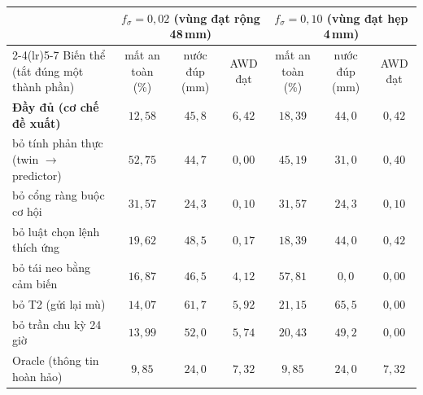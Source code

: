 
\begin{tabular}{@{}lcccccc@{}}
\toprule
 & \multicolumn{3}{c}{$f_\sigma=0{,}02$ (vùng đạt rộng 48\,mm)} & \multicolumn{3}{c}{$f_\sigma=0{,}10$ (vùng đạt hẹp 4\,mm)} \\
\cmidrule(lr){2-4}\cmidrule(lr){5-7}
Biến thể (tắt đúng một thành phần) & mất an toàn (\%) & nước đúp (mm) & AWD đạt & mất an toàn (\%) & nước đúp (mm) & AWD đạt \\
\midrule
\textbf{Đầy đủ (cơ chế đề xuất)} & $12{,}58$ & $45{,}8$ & $6{,}42$ & $18{,}39$ & $44{,}0$ & $0{,}42$ \\
bỏ tính phản thực (twin $\to$ predictor) & $52{,}75$ & $44{,}7$ & $0{,}00$ & $45{,}19$ & $31{,}0$ & $0{,}40$ \\
bỏ cổng ràng buộc cơ hội & $31{,}57$ & $24{,}3$ & $0{,}10$ & $31{,}57$ & $24{,}3$ & $0{,}10$ \\
bỏ luật chọn lệnh thích ứng & $19{,}62$ & $48{,}5$ & $0{,}17$ & $18{,}39$ & $44{,}0$ & $0{,}42$ \\
bỏ tái neo bằng cảm biến & $16{,}87$ & $46{,}5$ & $4{,}12$ & $57{,}81$ & $0{,}0$ & $0{,}00$ \\
bỏ T2 (gửi lại mù) & $14{,}07$ & $61{,}7$ & $5{,}92$ & $21{,}15$ & $65{,}5$ & $0{,}00$ \\
bỏ trần chu kỳ 24 giờ & $13{,}99$ & $52{,}0$ & $5{,}74$ & $20{,}43$ & $49{,}2$ & $0{,}00$ \\
Oracle (thông tin hoàn hảo) & $9{,}85$ & $24{,}0$ & $7{,}32$ & $9{,}85$ & $24{,}0$ & $7{,}32$ \\
\bottomrule
\end{tabular}
